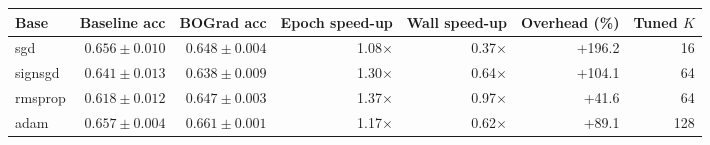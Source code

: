 \begin{tabular}{l r r r r r r}
\hline
\textbf{Base} & \textbf{Baseline acc} & \textbf{BOGrad acc} & \textbf{Epoch speed-up} & \textbf{Wall speed-up} & \textbf{Overhead (\%)} & \textbf{Tuned $K$} \\
\hline
sgd & $0.656 \pm 0.010$ & $0.648 \pm 0.004$ & 1.08$\times$ & 0.37$\times$ & +196.2 & 16 \\
signsgd & $0.641 \pm 0.013$ & $0.638 \pm 0.009$ & 1.30$\times$ & 0.64$\times$ & +104.1 & 64 \\
rmsprop & $0.618 \pm 0.012$ & $0.647 \pm 0.003$ & 1.37$\times$ & 0.97$\times$ & +41.6 & 64 \\
adam & $0.657 \pm 0.004$ & $0.661 \pm 0.001$ & 1.17$\times$ & 0.62$\times$ & +89.1 & 128 \\
\hline
\end{tabular}